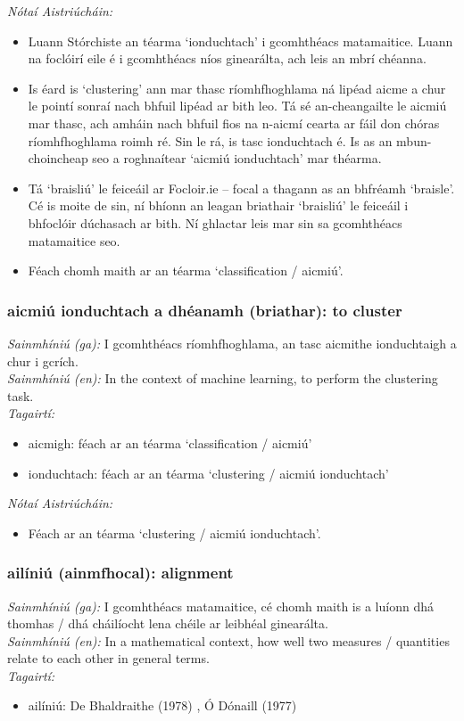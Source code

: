 \noindent \textit{Nótaí Aistriúcháin:}
\begin{itemize}
	\item Luann Stórchiste an téarma `ionduchtach' i gcomhthéacs matamaitice. Luann na foclóirí eile é i gcomhthéacs níos ginearálta, ach leis an mbrí chéanna.
	\item Is éard is `clustering' ann mar thasc ríomhfhoghlama ná lipéad aicme a chur le pointí sonraí nach bhfuil lipéad ar bith leo. Tá sé an-cheangailte le aicmiú mar thasc, ach amháin nach bhfuil fios na n-aicmí cearta ar fáil don chóras ríomhfhoghlama roimh ré. Sin le rá, is tasc ionduchtach é. Is as an mbun-choincheap seo a roghnaítear `aicmiú ionduchtach' mar théarma.
	\item Tá `braisliú' le feiceáil ar Focloir.ie -- focal a thagann as an bhfréamh `braisle'. Cé is moite de sin, ní bhíonn an leagan briathair `braisliú' le feiceáil i bhfoclóir dúchasach ar bith. Ní ghlactar leis mar sin sa gcomhthéacs matamaitice seo.
	\item Féach chomh maith ar an téarma `classification / aicmiú'.
\end{itemize}


\subsubsection*{aicmiú ionduchtach a dhéanamh (briathar): to cluster}
 \noindent \textit{Sainmhíniú (ga):} I gcomhthéacs ríomhfhoghlama, an tasc aicmithe ionduchtaigh a chur i gcrích.
\\
 \noindent \textit{Sainmhíniú (en):} In the context of machine learning, to perform the clustering task.
\\
 \noindent \textit{Tagairtí:}
\begin{itemize}
	\item aicmigh: féach ar an téarma `classification / aicmiú'
	\item ionduchtach: féach ar an téarma `clustering / aicmiú ionduchtach'
\end{itemize}

 \noindent \textit{Nótaí Aistriúcháin:}
\begin{itemize}
	\item Féach ar an téarma `clustering / aicmiú ionduchtach'.
\end{itemize}


\subsubsection*{ailíniú (ainmfhocal): alignment}
 \noindent \textit{Sainmhíniú (ga):} I gcomhthéacs matamaitice, cé chomh maith is a luíonn dhá thomhas / dhá cháilíocht lena chéile ar leibhéal ginearálta.
\\
 \noindent \textit{Sainmhíniú (en):} In a mathematical context, how well two measures / quantities relate to each other in general terms.
\\
 \noindent \textit{Tagairtí:}
\begin{itemize}
	\item ailíniú: De Bhaldraithe (1978) \cite{de-bhaldraithe}, Ó Dónaill (1977) \cite{odonaill}
\end{itemize}

